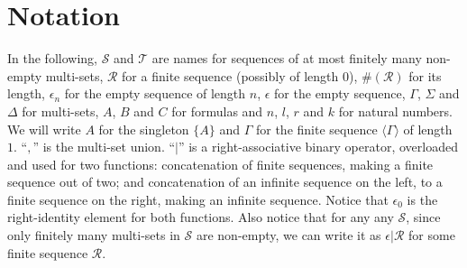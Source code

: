 \section{Notation} In the following, $\mathcal{S}$ and $\mathcal{T}$ are names for sequences of at most finitely many non-empty multi-sets, $\mathcal{R}$ for a finite sequence (possibly of length $0$), $\#(\mathcal{R})$ for its length, $\epsilon_n$ for the empty sequence of length $n$, $\epsilon$ for the empty sequence, $\Gamma$, $\Sigma$ and $\Delta$ for multi-sets, $A$, $B$ and $C$ for formulas and $n$, $l$, $r$ and $k$ for natural numbers. We will write $A$ for the singleton $\{A\}$ and $\Gamma$ for the finite sequence $\langle\Gamma\rangle$ of length $1$.
``$,$'' is the multi-set union.
``$|$'' is a right-associative binary operator, overloaded and used for two functions: concatenation of finite sequences, making a finite sequence out of two; and concatenation of an infinite sequence on the left, to a finite sequence on the right, making an infinite sequence. Notice that $\epsilon_0$ is the right-identity element for both functions. Also notice that for any  any $\mathcal{S}$, since only finitely many multi-sets in $\mathcal{S}$ are non-empty, we can write it as $\epsilon | \mathcal{R}$ for some finite sequence $\mathcal{R}$.


